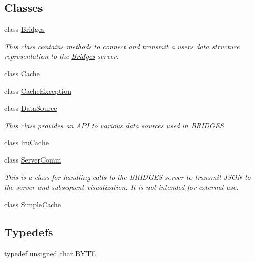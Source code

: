 \subsection*{Classes}
\begin{DoxyCompactItemize}
\item 
class \hyperlink{classbridges_1_1_bridges}{Bridges}
\begin{DoxyCompactList}\small\item\em This class contains methods to connect and transmit a user\textquotesingle{}s data structure representation to the \hyperlink{classbridges_1_1_bridges}{Bridges} server. \end{DoxyCompactList}\item 
class \hyperlink{classbridges_1_1_cache}{Cache}
\item 
class \hyperlink{classbridges_1_1_cache_exception}{Cache\+Exception}
\item 
class \hyperlink{classbridges_1_1_data_source}{Data\+Source}
\begin{DoxyCompactList}\small\item\em This class provides an A\+PI to various data sources used in B\+R\+I\+D\+G\+ES. \end{DoxyCompactList}\item 
class \hyperlink{classbridges_1_1lru_cache}{lru\+Cache}
\item 
class \hyperlink{classbridges_1_1_server_comm}{Server\+Comm}
\begin{DoxyCompactList}\small\item\em This is a class for handling calls to the B\+R\+I\+D\+G\+ES server to transmit J\+S\+ON to the server and subsequent visualization. It is not intended for external use. \end{DoxyCompactList}\item 
class \hyperlink{classbridges_1_1_simple_cache}{Simple\+Cache}
\end{DoxyCompactItemize}
\subsection*{Typedefs}
\begin{DoxyCompactItemize}
\item 
typedef unsigned char \hyperlink{namespacebridges_a59b77ee45243ba85c701fb8ab298ef00}{B\+Y\+TE}
\end{DoxyCompactItemize}
